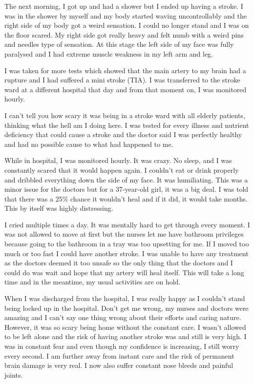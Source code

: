 The next morning, I got up and had a shower but I ended up having a stroke. I
was in the shower by myself and my body started waving uncontrollably and the
right side of my body got a weird sensation. I could no longer stand and I was
on the floor scared. My right side got really heavy and felt numb with a weird
pins and needles type of sensation. At this stage the left side of my face was
fully paralysed and I had extreme muscle weakness in my left arm and leg.

I was taken for more tests which showed that the main artery to my brain had a
rupture and I had suffered a mini stroke (TIA). I was transferred to the stroke
ward at a different hospital that day and from that moment on, I was monitored
hourly.

I can’t tell you how scary it was being in a stroke ward with all elderly
patients, thinking what the hell am I doing here. I was tested for every illness
and nutrient deficiency that could cause a stroke and the doctor said I was
perfectly healthy and had no possible cause to what had happened to me.

While in hospital, I was monitored hourly. It was crazy. No sleep, and I was
constantly scared that it would happen again. I couldn’t eat or drink properly
and dribbled everything down the side of my face. It was humiliating. This was a
minor issue for the doctors but for a 37-year-old girl, it was a big deal. I was
told that there was a 25\% chance it wouldn’t heal and if it did, it would take
months. This by itself was highly distressing.

I cried multiple times a day. It was mentally hard to get through every
moment. I was not allowed to move at first but the nurses let me have bathroom
privileges because going to the bathroom in a tray was too upsetting for me. If
I moved too much or too fast I could have another stroke. I was unable to have
any treatment as the doctors deemed it too unsafe so the only thing that the
doctors and I could do was wait and hope that my artery will heal itself. This
will take a long time and in the meantime, my usual activities are on hold.

When I was discharged from the hospital, I was really happy as I couldn’t stand
being locked up in the hospital. Don’t get me wrong, my nurses and doctors were
amazing and I can’t say one thing wrong about their efforts and caring
nature. However, it was so scary being home without the constant care. I wasn’t
allowed to be left alone and the risk of having another stroke was and still is
very high. I was in constant fear and even though my confidence is increasing, I
still worry every second. I am further away from instant care and the risk of
permanent brain damage is very real. I now also suffer constant nose bleeds and
painful joints.

